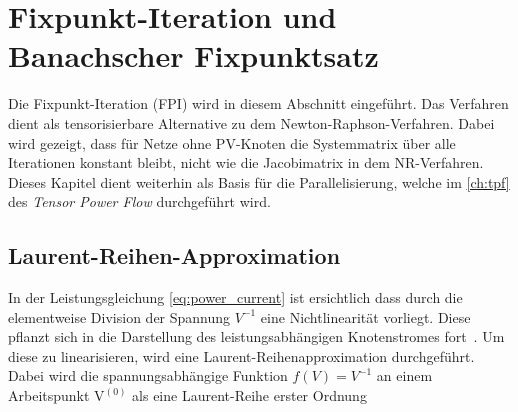 \section{Fixpunkt-Iteration und Banachscher Fixpunktsatz}
\label{sec:fpi}



Die Fixpunkt-Iteration (FPI) wird in diesem Abschnitt eingeführt. 
Das Verfahren dient als tensorisierbare Alternative zu dem Newton-Raphson-Verfahren.
Dabei wird gezeigt, dass für Netze ohne PV-Knoten die Systemmatrix über alle Iterationen konstant bleibt, nicht wie die Jacobimatrix in dem NR-Verfahren.
Dieses Kapitel dient weiterhin als Basis für die Parallelisierung, welche im \cref{ch:tpf} des \emph{Tensor Power Flow} durchgeführt wird.





\subsection{Laurent-Reihen-Approximation}
\label{subsec:laurent}


In der Leistungsgleichung \eqref{eq:power_current} ist ersichtlich dass durch die elementweise Division der Spannung $V^{-1}$ eine Nichtlinearität vorliegt.
Diese pflanzt sich in die Darstellung des leistungsabhängigen Knotenstromes fort~\cite{Giraldo2022}.
Um diese zu linearisieren, wird eine Laurent-Reihenapproximation durchgeführt.
Dabei wird die spannungsabhängige Funktion $f(V) = V^{-1}$ an einem Arbeitspunkt $\mathrm{V}^{(0)}$ als eine Laurent-Reihe erster Ordnung

